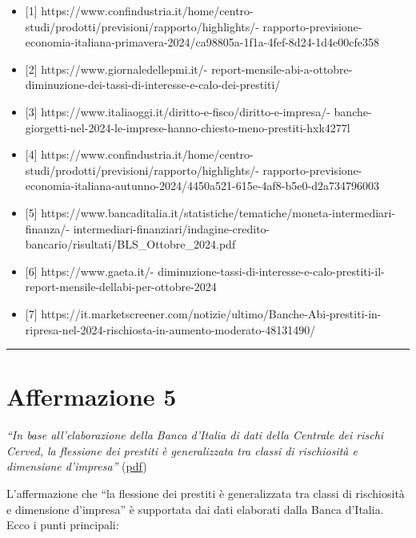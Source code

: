 \documentclass[
  letterpaper,
  DIV=11,
  numbers=noendperiod]{scrartcl}
\providecommand{\tightlist}{%
  \setlength{\itemsep}{0pt}\setlength{\parskip}{0pt}}\usepackage{longtable,booktabs,array}
\begin{document}
\begin{itemize}
\tightlist
\item
  {[}1{]}
  https://www.confindustria.it/home/centro-studi/prodotti/previsioni/rapporto/highlights/-
  rapporto-previsione-economia-italiana-primavera-2024/ca98805a-1f1a-4fef-8d24-1d4e00cfe358
\item
  {[}2{]} https://www.giornaledellepmi.it/-
  report-mensile-abi-a-ottobre-diminuzione-dei-tassi-di-interesse-e-calo-dei-prestiti/
\item
  {[}3{]} https://www.italiaoggi.it/diritto-e-fisco/diritto-e-impresa/-
  banche-giorgetti-nel-2024-le-imprese-hanno-chiesto-meno-prestiti-hxk4277l
\item
  {[}4{]}
  https://www.confindustria.it/home/centro-studi/prodotti/previsioni/rapporto/highlights/-
  rapporto-previsione-economia-italiana-autunno-2024/4450a521-615e-4af8-b5e0-d2a734796003
\item
  {[}5{]}
  https://www.bancaditalia.it/statistiche/tematiche/moneta-intermediari-finanza/-
  intermediari-finanziari/indagine-credito-bancario/risultati/BLS\_Ottobre\_2024.pdf
\item
  {[}6{]} https://www.gaeta.it/-
  diminuzione-tassi-di-interesse-e-calo-prestiti-il-report-mensile-dellabi-per-ottobre-2024
\item
  {[}7{]}
  https://it.marketscreener.com/notizie/ultimo/Banche-Abi-prestiti-in-ripresa-nel-2024-rischiosta-in-aumento-moderato-48131490/
\end{itemize}

\begin{center}\rule{0.5\linewidth}{0.5pt}\end{center}

\section{Affermazione 5}\label{affermazione-5}

\emph{``In base all'elaborazione della Banca d'Italia di dati della
Centrale dei rischi Cerved, la flessione dei prestiti è generalizzata
tra classi di rischiosità e dimensione d'impresa''}
(\href{zotero://open-pdf/library/items/B4RMZ7B3?page=2&annotation=33H6DFF3}{pdf})

L'affermazione che ``la flessione dei prestiti è generalizzata tra
classi di rischiosità e dimensione d'impresa'' è supportata dai dati
elaborati dalla Banca d'Italia. Ecco i punti principali:
\end{document}
